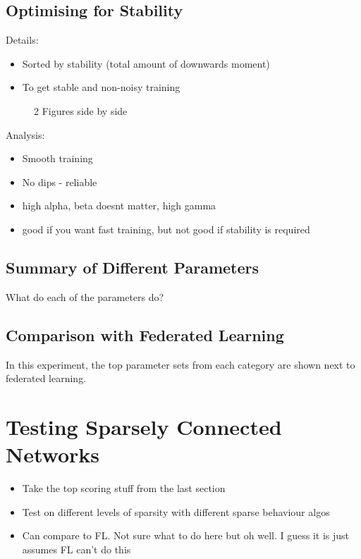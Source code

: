 \subsection{Optimising for Stability}
Details:
\begin{itemize}
	\item Sorted by stability (total amount of downwards moment)
	\item To get stable and non-noisy training
\end{itemize}

\begin{figure}
	\centering
	\qquad
	\caption{2 Figures side by side}%
	\label{fig:ex_stab}%
\end{figure}

Analysis:
\begin{itemize}
	\item Smooth training
	\item No dips - reliable
	\item high alpha, beta doesnt matter, high gamma
	\item good if you want fast training, but not good if stability is required
\end{itemize}

\subsection{Summary of Different Parameters}
What do each of the parameters do?

\subsection{Comparison with Federated Learning}
In this experiment, the top parameter sets from each category are shown next to federated learning.


\section{Testing Sparsely Connected Networks}
\begin{itemize}
	\item Take the top scoring stuff from the last section
	\item Test on different levels of sparsity with different sparse behaviour algos
	\item Can compare to FL. Not sure what to do here but oh well. I guess it is just assumes FL can't do this
\end{itemize}